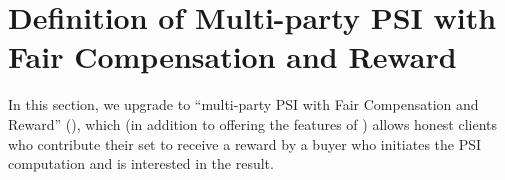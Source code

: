 





\section{Definition of Multi-party PSI with Fair Compensation and Reward}


In this section, we upgrade \p to ``multi-party PSI with Fair Compensation and Reward'' (\ep), which (in addition to offering the features of \p) allows honest clients who contribute their set to receive a reward by a buyer who initiates the PSI computation and is interested in the result.





%  


